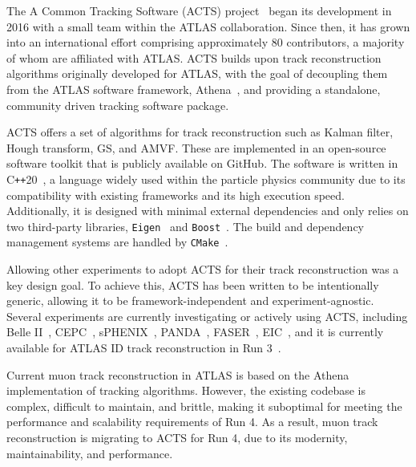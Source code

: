 The A Common Tracking Software (ACTS) project~\cite{Salzburger_A_Common_Tracking_2021, Ai:2021ghi} began its development in 2016 with a small team within the ATLAS collaboration. Since then, it has grown into an international effort comprising approximately 80 contributors, a majority of whom are affiliated with ATLAS\@. ACTS builds upon track reconstruction algorithms originally developed for ATLAS, with the goal of decoupling them from the ATLAS software framework, Athena~\cite{atlas_collaboration_2021_4772550}, and providing a standalone, community driven tracking software package.

ACTS offers a set of algorithms for track reconstruction such as Kalman filter, Hough transform, GS, and AMVF\@. These are implemented in an open-source software toolkit that is publicly available on GitHub. The software is written in C\texttt{++}20~\cite{iso_cpp20}, a language widely used within the particle physics community due to its compatibility with existing frameworks and its high execution speed. Additionally, it is designed with minimal external dependencies and only relies on two third-party libraries, \texttt{Eigen}~\cite{eigenweb} and \texttt{Boost}~\cite{boost}. The build and dependency management systems are handled by \texttt{CMake}~\cite{cmake}.

Allowing other experiments to adopt ACTS for their track reconstruction was a key design goal. To achieve this, ACTS has been written to be intentionally generic, allowing it to be framework-independent and experiment-agnostic. Several experiments are currently investigating or actively using ACTS, including Belle II~\cite{Belle-II:2010dht}, CEPC~\cite{CEPCStudyGroup:2023quu}, sPHENIX~\cite{Osborn:2021zlr}, PANDA~\cite{SMYRSKI201285}, FASER~\cite{FASER:2022hcn}, EIC~\cite{osti_1765663}, and it is currently available for ATLAS ID track reconstruction in Run 3~\cite{Mlinarevic:2024ntj}. 

Current muon track reconstruction in ATLAS is based on the Athena implementation of tracking algorithms. However, the existing codebase is complex, difficult to maintain, and brittle, making it suboptimal for meeting the performance and scalability requirements of Run 4. As a result, muon track reconstruction is migrating to ACTS for Run 4, due to its modernity, maintainability, and performance.


